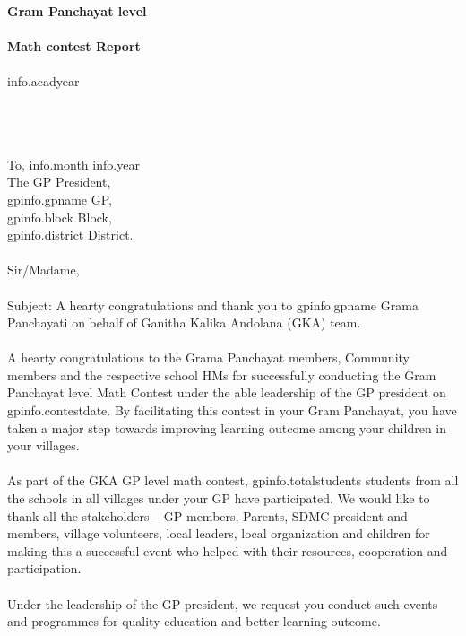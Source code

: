 \documentclass[12pt]{article}
\begin{document}
\begin{titlepage}
    \thispagestyle{title}
    \begin{center}
    \vspace*{10.5cm}
     \textbf{\huge Gram Panchayat level} \\~\\
        \textbf{\huge Math contest Report} \\~\\
	    \Large{{info.acadyear}}
    \end{center}
\end{titlepage}
\pagebreak

\thispagestyle{plain}
{
\setlength{\parindent}{0in}
~\\~\\~\\
To, \hfill  {{info.month}} {{info.year}} \\ [2ex]
The GP President,\\ [1ex]
{{gpinfo.gpname}} GP,\\ [1ex]
{{gpinfo.block}} Block,\\ [1ex]
{{gpinfo.district}} District.
\\~\\ [2ex]
Sir/Madame,
\\~\\
Subject: A hearty congratulations and thank you to {{gpinfo.gpname}} Grama Panchayati on behalf of Ganitha Kalika Andolana (GKA) team.
\\~\\
A hearty congratulations to the Grama Panchayat members, Community members and the respective school HMs for successfully conducting the Gram Panchayat level Math Contest under the able leadership of the GP president on {{gpinfo.contestdate}}. By facilitating this contest in your Gram Panchayat, you have taken a major step towards improving learning outcome among your children in your villages.
\\~\\
As part of the GKA GP level math contest, {{gpinfo.totalstudents}} students from all the schools in all villages under your GP have participated. We would like to thank all the stakeholders – GP members, Parents, SDMC president and members, village volunteers, local leaders, local organization and children for making this a successful event who helped with their resources, cooperation and participation.
\\~\\
Under the leadership of the GP president, we request you conduct such events and programmes for quality education and better learning outcome.
}
\end{document}
